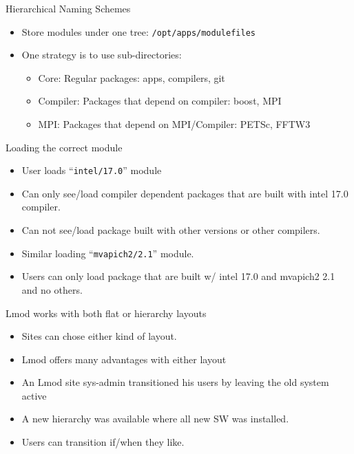 \documentclass{beamer}
\begin{document}
\begin{frame}{Hierarchical Naming Schemes}
  \begin{itemize}
    \item Store modules under one tree: \texttt{/opt/apps/modulefiles}
    \item One strategy is to use sub-directories:
      \begin{itemize}
        \item Core: Regular packages: apps, compilers, git
        \item Compiler: Packages that depend on compiler: boost, MPI
        \item MPI: Packages that depend on MPI/Compiler: PETSc, FFTW3
      \end{itemize}
  \end{itemize}
\end{frame}

\begin{frame}{Loading the correct module}
  \begin{itemize}
    \item User loads ``\texttt{intel/17.0}'' module
    \item Can only see/load compiler dependent packages that are built with
      intel 17.0 compiler.
    \item Can not see/load package built with other versions or other compilers.
    \item Similar loading ``\texttt{mvapich2/2.1}'' module.
    \item Users can only load package that are built w/ intel 17.0 and
      mvapich2 2.1 and no others.
  \end{itemize}
\end{frame}

\begin{frame}{Lmod works with both flat or hierarchy layouts}
  \begin{itemize}
    \item Sites can chose either kind of layout.  
    \item Lmod offers many advantages with either layout
    \item An Lmod site sys-admin transitioned his users by leaving the
      old system active
    \item A new hierarchy was available where all new SW was installed.
    \item Users can transition if/when they like.
  \end{itemize}
\end{frame}
\end{document}
